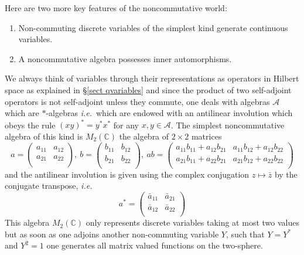 \documentclass[12pt]{article}
\def\C{{\mathbb C}}
\def\cA{{\mathcal A}}
\newcommand{\ie}{{\it i.e.\/}\ }
\begin{document}
Here are two more key features of the noncommutative world:
\begin{enumerate}
\item Non-commuting discrete variables of the simplest kind generate continuous variables.
\item A noncommutative algebra possesses inner automorphisms. 	
\end{enumerate}
We always think of variables through their representations as operators in Hilbert space as explained  in \S \ref{sect qvariables} and since the product of two self-adjoint operators is not self-adjoint unless they commute, one deals with algebras $\cA$ which are $*$-algebras \ie which  are endowed with an antilinear involution which obeys the rule $(xy)^*=y^*x^*$ for any $x,y\in\cA$. The simplest noncommutative algebra of this kind is $M_2(\C)$ the algebra of $2\times 2$ matrices 
$$
a=\left(
\begin{array}{cc}
 a_{11} & a_{12} \\
 a_{21} & a_{22} \\
\end{array}
\right),  \ b=\left(
\begin{array}{cc}
 b_{11} & b_{12} \\
 b_{21} & b_{22} \\
\end{array}
\right), \ ab=\left(
\begin{array}{cc}
 a_{11} b_{11}+a_{12} b_{21} & a_{11} b_{12}+a_{12} b_{22} \\
 a_{21} b_{11}+a_{22} b_{21} & a_{21} b_{12}+a_{22} b_{22} \\
\end{array}
\right)
$$
and the antilinear involution is given using the complex conjugation $z\mapsto \bar z$ by the conjugate transpose, \ie 
$$
a^*=\left(
\begin{array}{cc}
  \bar a_{11} & \bar a_{21} \\
 \bar a_{12} &\bar a_{22} \\
\end{array}
\right)
$$
This algebra $M_2(\C)$ only represents discrete variables taking at most two values but as soon as one adjoins another non-commuting variable  $Y$, such that $Y=Y^*$ and $Y^2=1$ one generates all matrix valued functions on the two-sphere.
\end{document}
